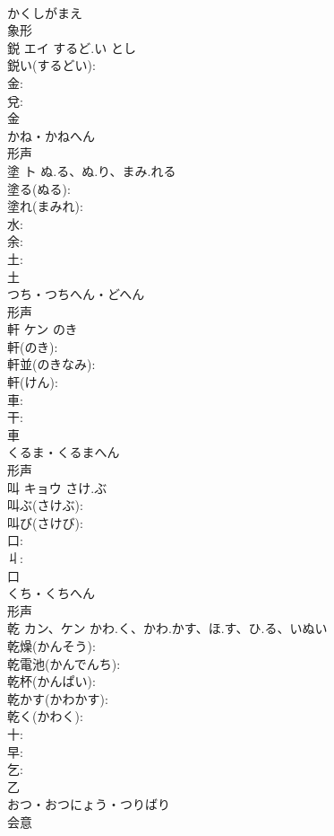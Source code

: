 \documentclass[8pt]{extreport}
\begin{document}
\begin{CJK}{UTF8}{min}
\\	かくしがまえ	
\\	象形 
\\	鋭	エイ	するど.い	とし	
\\	鋭い(するどい): 
\\	金: 
\\	兌: 
\\	金	
\\	かね・かねへん	
\\	形声 
\\	塗	ト	ぬ.る、ぬ.り、まみ.れる		
\\	塗る(ぬる): 
\\	塗れ(まみれ): 
\\	水: 
\\	余: 
\\	土: 
\\	土	
\\	つち・つちへん・どへん	
\\	形声 
\\	軒	ケン	のき		
\\	軒(のき): 
\\	軒並(のきなみ): 
\\	軒(けん): 
\\	車: 
\\	干: 
\\	車	
\\	くるま・くるまへん	
\\	形声 
\\	叫	キョウ	さけ.ぶ		
\\	叫ぶ(さけぶ): 
\\	叫び(さけび): 
\\	口: 
\\	丩: 
\\	口	
\\	くち・くちへん	
\\	形声 
\\	乾	カン、ケン	かわ.く、かわ.かす、ほ.す、ひ.る、いぬい		
\\	乾燥(かんそう): 
\\	乾電池(かんでんち): 
\\	乾杯(かんぱい): 
\\	乾かす(かわかす): 
\\	乾く(かわく): 
\\	十: 
\\	早: 
\\	乞: 
\\	乙	
\\	おつ・おつにょう・つりばり	
\\	会意 

\end{CJK}
\end{document}
